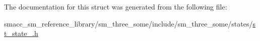 The documentation for this struct was generated from the following file\+:\begin{DoxyCompactItemize}
\item 
smacc\+\_\+sm\+\_\+reference\+\_\+library/sm\+\_\+three\+\_\+some/include/sm\+\_\+three\+\_\+some/states/\hyperlink{sm__three__some_2include_2sm__three__some_2states_2st__state__2_8h}{st\+\_\+state\+\_.\+h}\end{DoxyCompactItemize}
